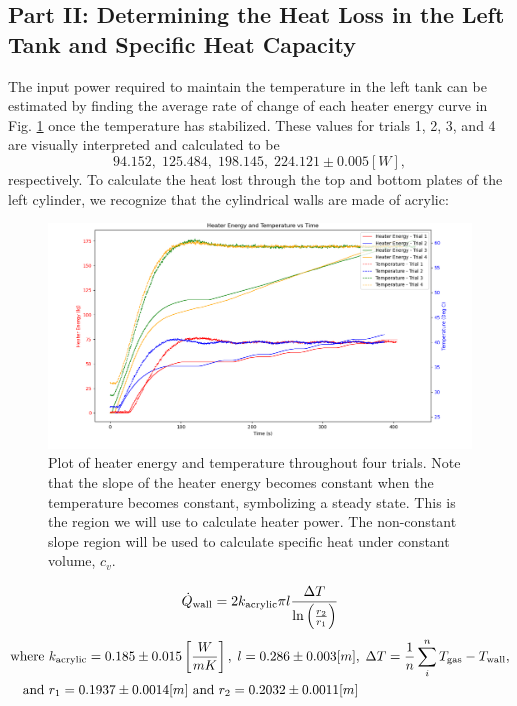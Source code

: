 \documentclass[12pt]{article}
\begin{document}
\subsection*{Part II:  Determining the Heat Loss in the Left Tank and Specific Heat Capacity}
The input power required to maintain the temperature in the left tank can be estimated by finding the average rate of change of each heater energy curve in Fig. \ref{fig:heater} once the temperature has stabilized. These values for trials 1, 2, 3, and 4 are visually interpreted and calculated to be $$94.152,\;125.484,\;198.145,\;224.121\pm{0.005}[W],$$ respectively.
To calculate the heat lost through the top and bottom plates of the left cylinder, we recognize that the cylindrical walls are made of acrylic:
\begin{figure}[t!]
\centering
\includegraphics[width=1\linewidth]{figure/heater.png}
\caption{Plot of heater energy and temperature throughout four trials. Note that the slope of the heater energy becomes constant when the temperature becomes constant, symbolizing a steady state. This is the region we will use to calculate heater power. The non-constant slope region will be used to calculate specific heat under constant volume, $c_v$.}
\label{fig:heater}
\end{figure}
\begin{equation}
    \dot{Q}_{\rm wall}=2k_{\rm acrylic}\pi l\frac{\Delta T}{\ln\left(\frac{r_2}{r_1}\right)}
    \label{eq:heatlosswall}
\end{equation}
\begin{align*}
    \text{where } 
    &k_{\rm acrylic} = 0.185\pm0.015\left[\frac{W}{mK}\right],\;l=0.286\pm0.003[m],\;\Delta T=\frac{1}{n}\sum_i^n T_{\rm gas}-T_{\rm wall},\\
    \text{and }&r_1=0.1937\pm0.0014[m]\text{ and }r_2=0.2032\pm0.0011[m]
\end{align*}
\end{document}
